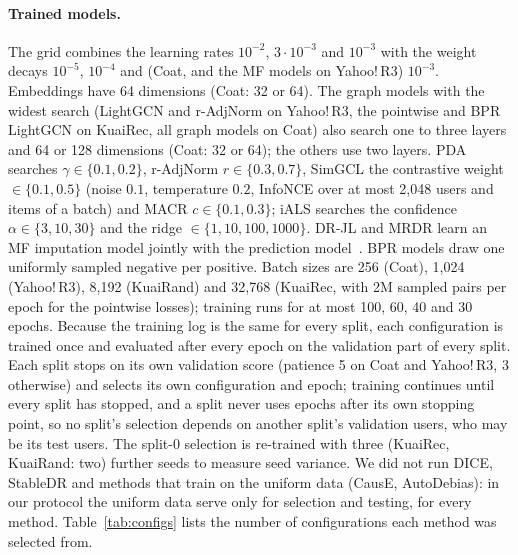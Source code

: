 \paragraph{Trained models.}
The grid combines the learning rates $10^{-2}$, $3\cdot10^{-3}$ and $10^{-3}$ with the
weight decays $10^{-5}$, $10^{-4}$ and (Coat, and the MF models on Yahoo!\,R3)
$10^{-3}$. Embeddings have 64 dimensions (Coat: 32 or 64). The graph models with
the widest search (LightGCN and r-AdjNorm on Yahoo!\,R3, the pointwise
and BPR LightGCN on KuaiRec, all graph models on Coat) also search one to three
layers and 64 or 128 dimensions (Coat: 32 or 64); the others use two layers.
PDA searches $\gamma\in\{0.1,0.2\}$, r-AdjNorm $r\in\{0.3,0.7\}$, SimGCL the
contrastive weight $\in\{0.1,0.5\}$ (noise $0.1$, temperature $0.2$, InfoNCE over at
most 2{,}048 users and items of a batch) and MACR $c\in\{0.1,0.3\}$; iALS searches
the confidence $\alpha\in\{3,10,30\}$ and the ridge $\in\{1,10,100,1000\}$. DR-JL and MRDR
learn an MF imputation model jointly with the prediction
model~\cite{wang2019drjl,guo2021mrdr}. BPR models draw one uniformly sampled
negative per positive. Batch sizes are 256 (Coat), 1{,}024 (Yahoo!\,R3), 8{,}192
(KuaiRand) and 32{,}768 (KuaiRec, with 2M sampled pairs per epoch for the
pointwise losses); training runs for at most 100, 60, 40 and 30 epochs. Because
the training log is the same for every split, each configuration is trained
once and evaluated after every epoch on the validation part of every split.
Each split stops on its own validation score (patience 5 on Coat and
Yahoo!\,R3, 3 otherwise) and selects its own configuration and epoch; training
continues until every split has stopped, and a split never uses epochs after
its own stopping point, so no split's selection depends on another split's
validation users, who may be its test users. The split-0 selection is
re-trained with three (KuaiRec, KuaiRand: two) further seeds to measure seed
variance. We did not run DICE, StableDR and methods that train on the uniform
data (CausE, AutoDebias): in our protocol the uniform data serve only for
selection and testing, for every method. Table~\ref{tab:configs} lists the
number of configurations each method was selected from.

\begin{table}[h]\centering\footnotesize
\caption{Number of configurations searched per method (per split).}\label{tab:configs}

\end{table}

